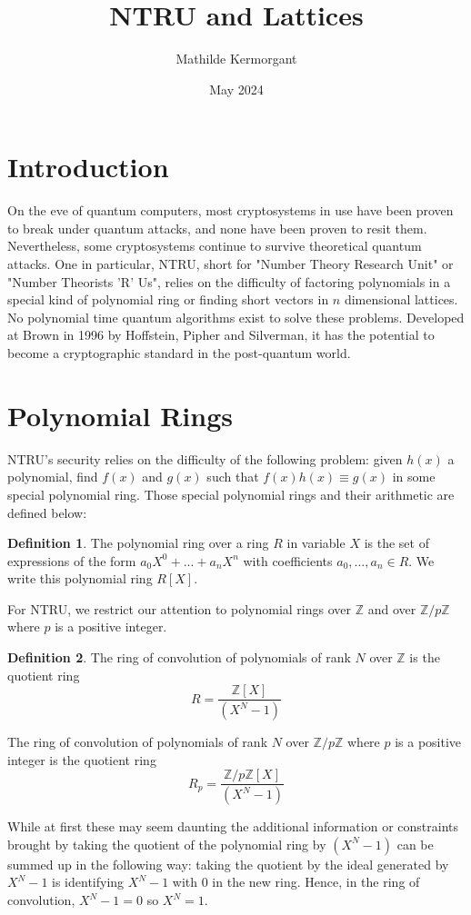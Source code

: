 \documentclass[12pt]{article}
\title{NTRU and Lattices}
\author{Mathilde Kermorgant}
\date{May 2024}
\theoremstyle{definition}
\newtheorem{definition}{Definition}[section]
\theoremstyle{proposition}
\theoremstyle{remark}
\theoremstyle{theorem}
\theoremstyle{example}
\newcommand{\Z}{\mathbb{Z}}
\begin{document}
\maketitle
\section*{Introduction}
On the eve of quantum computers, most cryptosystems in use have been proven to break under quantum attacks, and none have been proven to resit them. Nevertheless, some cryptosystems continue to survive theoretical quantum attacks. One in particular, NTRU, short for "Number Theory Research Unit" or "Number Theorists 'R' Us", relies on the difficulty of factoring polynomials in a special kind of polynomial ring or finding short vectors in $n$ dimensional lattices. No polynomial time quantum algorithms exist to solve these problems. Developed at Brown in 1996 by Hoffstein, Pipher and Silverman, it has the potential to become a cryptographic standard in the post-quantum world.

\section{Polynomial Rings}

NTRU's security relies on the difficulty of the following problem: given $h(x)$ a polynomial, find $f(x)$ and $g(x)$ such that $f(x)h(x) \equiv g(x)$ in some special polynomial ring. Those special polynomial rings and their arithmetic are defined below:

\begin{definition}
    The polynomial ring over a ring $R$ in variable $X$ is the set of expressions of the form $a_0 X^0+ ... + a_n X^n$ with coefficients $a_0,...,a_n \in R$. We write this polynomial ring $R[X]$. 
\end{definition}

For NTRU, we restrict our attention to polynomial rings over $\Z$ and over $\Z/p\Z$ where $p$ is a positive integer.

\begin{definition}
    The ring of convolution of polynomials of rank $N$ over $\Z$ is the quotient ring $$R = \frac{\Z[X]}{(X^N-1)}$$

    The ring of convolution of polynomials of rank $N$ over $\Z/p\Z$ where $p$ is a positive integer is the quotient ring $$R_p = \frac{\Z/p\Z[X]}{(X^N-1)}$$
\end{definition}

While at first these may seem daunting the additional information or constraints brought by taking the quotient of the polynomial ring by $(X^N -1)$ can be summed up in the following way: taking the quotient by the ideal generated by $X^N -1$ is identifying $X^N -1$ with $0$ in the new ring. Hence, in the ring of convolution, $X^N - 1 = 0$ so $X^N = 1$.
\end{document}
